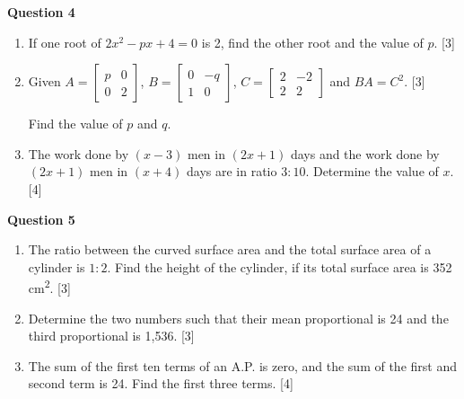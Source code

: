 \noindent
\textbf{Question 4}
\begin{enumerate}[label=(\roman*)]

    \item If one root of $2x^2 - px + 4 = 0$ is 2, find the other root 
        and the value of $p$. \hfill [3]

    \item Given $A = \begin{bmatrix*} p & 0 \\ 0 & 2 \end{bmatrix*}$, 
        $B = \begin{bmatrix*} 0 & -q \\ 1 & 0 \end{bmatrix*}$,  
        $C = \begin{bmatrix*} 2 & -2 \\ 2 & 2 \end{bmatrix*}$ and 
        $BA = C^2$. \hfill [3]

        Find the value of $p$ and $q$.

    \item The work done by $(x-3)$ men in $(2x+1)$ days and the 
        work done by $(2x+1)$ men in $(x+4)$ days are in ratio $3:10$. 
        Determine the value of $x$. \hfill [4]

\end{enumerate}

\noindent
\textbf{Question 5}
\begin{enumerate}[label=(\roman*)]

    \item The ratio between the curved surface area and the total surface 
        area of a cylinder is $1:2$. Find the height of the cylinder, if 
        its total surface area is 352 cm\textsuperscript{2}. \hfill [3]

    \item Determine the two numbers such that their mean proportional is 24 and 
        the third proportional is 1,536. \hfill [3]

    \item The sum of the first ten terms of an A.P. is zero, and the 
        sum of the first and second term is 24. Find the first three 
        terms. \hfill [4]

\end{enumerate}

